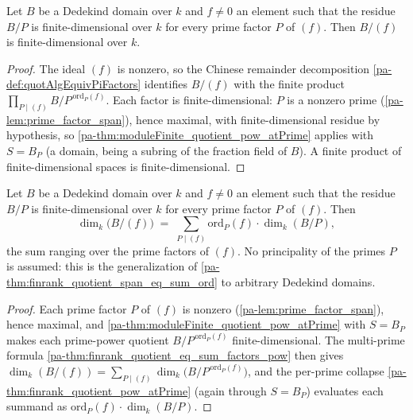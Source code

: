 \begin{theorem}
  \label{pa-thm:moduleFinite_quotient_span}
  \leanok

  Let \(B\) be a Dedekind domain over \(k\) and \(f \neq 0\) an element such that the
  residue \(B/P\) is finite-dimensional over \(k\) for every prime factor \(P\) of
  \((f)\). Then \(B/(f)\) is finite-dimensional over \(k\).
\end{theorem}
\begin{proof}
  \leanok
  The ideal \((f)\) is nonzero, so the Chinese remainder decomposition
  \ref{pa-def:quotAlgEquivPiFactors} identifies \(B/(f)\) with the finite product
  \(\prod_{P \mid (f)} B/P^{\,\mathrm{ord}_P(f)}\). Each factor is
  finite-dimensional: \(P\) is a nonzero prime (\ref{pa-lem:prime_factor_span}), hence
  maximal, with finite-dimensional residue by hypothesis, so
  \ref{pa-thm:moduleFinite_quotient_pow_atPrime} applies with \(S = B_P\) (a domain,
  being a subring of the fraction field of \(B\)). A finite product of
  finite-dimensional spaces is finite-dimensional.
\end{proof}

\begin{theorem}
  \label{pa-thm:finrank_quotient_span_eq_sum_count}
  \leanok

  Let \(B\) be a Dedekind domain over \(k\) and \(f \neq 0\) an element such that the
  residue \(B/P\) is finite-dimensional over \(k\) for every prime factor \(P\) of
  \((f)\). Then
  \[
    \dim_k\bigl(B/(f)\bigr) \;=\;
      \sum_{P \mid (f)} \mathrm{ord}_P(f) \cdot \dim_k(B/P) ,
  \]
  the sum ranging over the prime factors of \((f)\). No principality of the primes
  \(P\) is assumed: this is the generalization of
  \ref{pa-thm:finrank_quotient_span_eq_sum_ord} to arbitrary Dedekind domains.
\end{theorem}
\begin{proof}
  \leanok
  Each prime factor \(P\) of \((f)\) is nonzero (\ref{pa-lem:prime_factor_span}), hence
  maximal, and \ref{pa-thm:moduleFinite_quotient_pow_atPrime} with \(S = B_P\) makes each
  prime-power quotient \(B/P^{\,\mathrm{ord}_P(f)}\) finite-dimensional. The
  multi-prime formula \ref{pa-thm:finrank_quotient_eq_sum_factors_pow} then gives
  \(\dim_k(B/(f)) = \sum_{P \mid (f)} \dim_k\bigl(B/P^{\,\mathrm{ord}_P(f)}\bigr)\),
  and the per-prime collapse \ref{pa-thm:finrank_quotient_pow_atPrime} (again through
  \(S = B_P\)) evaluates each summand as
  \(\mathrm{ord}_P(f) \cdot \dim_k(B/P)\).
\end{proof}

